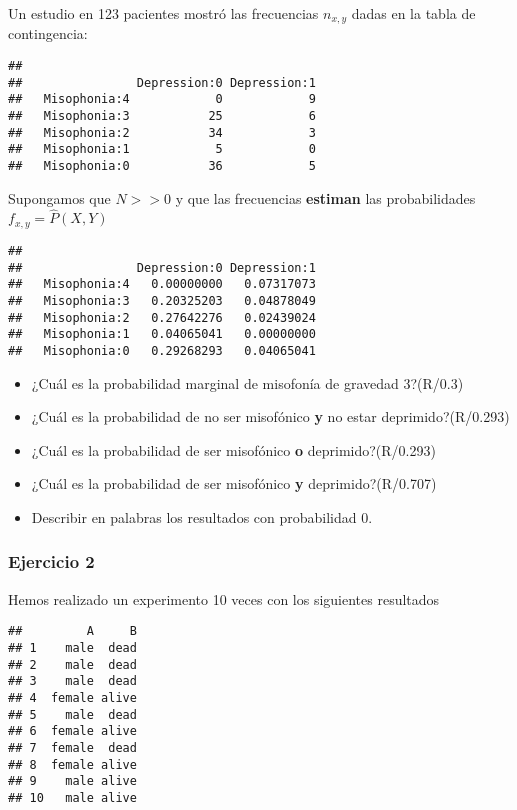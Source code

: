 \documentclass[
]{book}
\providecommand{\tightlist}{%
  \setlength{\itemsep}{0pt}\setlength{\parskip}{0pt}}
\begin{document}
Un estudio en 123 pacientes mostró las frecuencias \(n_{x,y}\) dadas en la tabla de contingencia:

\begin{verbatim}
##               
##                Depression:0 Depression:1
##   Misophonia:4            0            9
##   Misophonia:3           25            6
##   Misophonia:2           34            3
##   Misophonia:1            5            0
##   Misophonia:0           36            5
\end{verbatim}

Supongamos que \(N>>0\) y que las frecuencias \textbf{estiman} las probabilidades \(f_{x,y}=\hat{P}(X, Y)\)

\begin{verbatim}
##               
##                Depression:0 Depression:1
##   Misophonia:4   0.00000000   0.07317073
##   Misophonia:3   0.20325203   0.04878049
##   Misophonia:2   0.27642276   0.02439024
##   Misophonia:1   0.04065041   0.00000000
##   Misophonia:0   0.29268293   0.04065041
\end{verbatim}

\begin{itemize}
\tightlist
\item
  ¿Cuál es la probabilidad marginal de misofonía de gravedad 3?(R/0.3)
\item
  ¿Cuál es la probabilidad de no ser misofónico \textbf{y} no estar deprimido?(R/0.293)
\item
  ¿Cuál es la probabilidad de ser misofónico \textbf{o} deprimido?(R/0.293)
\item
  ¿Cuál es la probabilidad de ser misofónico \textbf{y} deprimido?(R/0.707)
\item
  Describir en palabras los resultados con probabilidad 0.
\end{itemize}

\hypertarget{ejercicio-2-1}{%
\subsubsection{Ejercicio 2}\label{ejercicio-2-1}}

Hemos realizado un experimento 10 veces con los siguientes resultados

\begin{verbatim}
##         A     B
## 1    male  dead
## 2    male  dead
## 3    male  dead
## 4  female alive
## 5    male  dead
## 6  female alive
## 7  female  dead
## 8  female alive
## 9    male alive
## 10   male alive
\end{verbatim}
\end{document}

